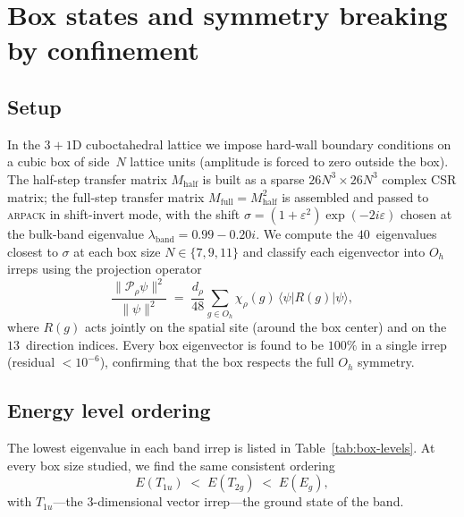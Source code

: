 \documentclass[twocolumn,showpacs,preprintnumbers,amsmath,amssymb]{revtex4-2}
\newcommand{\eps}{\varepsilon}
\newcommand{\Oh}{O_{h}}
\begin{document}
\section{Box states and symmetry breaking by confinement}
\label{sec:box}

\subsection{Setup}

In the $3{+}1$D cuboctahedral lattice we impose hard-wall boundary
conditions on a cubic box of side~$N$ lattice units (amplitude is
forced to zero outside the box).
The half-step transfer matrix $M_{\mathrm{half}}$ is built as a sparse
$26N^{3}\times 26N^{3}$ complex CSR matrix; the full-step transfer
matrix $M_{\mathrm{full}}=M_{\mathrm{half}}^{2}$ is assembled and passed
to \textsc{arpack} in shift-invert mode, with the shift
$\sigma=(1+\eps^{2})\exp(-2i\eps)$ chosen at the bulk-band eigenvalue
$\lambda_{\text{band}}=0.99-0.20i$.
We compute the $40$~eigenvalues closest to $\sigma$ at each box size
$N\in\{7,9,11\}$ and classify each eigenvector into $\Oh$ irreps using
the projection operator
\begin{equation}
  \frac{\|\mathcal{P}_{\rho}\psi\|^{2}}{\|\psi\|^{2}}
    \;=\; \frac{d_{\rho}}{48}\sum_{g\in\Oh}
           \chi_{\rho}(g)\,\langle\psi|R(g)|\psi\rangle,
  \label{eq:proj}
\end{equation}
where $R(g)$ acts jointly on the spatial site (around the box center)
and on the $13$~direction indices.
Every box eigenvector is found to be $100\%$ in a single irrep
(residual $<10^{-6}$), confirming that the box respects the full
$\Oh$ symmetry.

\subsection{Energy level ordering}

The lowest eigenvalue in each band irrep is listed in
Table~\ref{tab:box-levels}.
At every box size studied, we find the same consistent ordering
\begin{equation}
  E(T_{1u})\;<\;E(T_{2g})\;<\;E(E_{g}),
  \label{eq:order}
\end{equation}
with $T_{1u}$---the $3$-dimensional vector irrep---the ground state of
the band.
\end{document}
